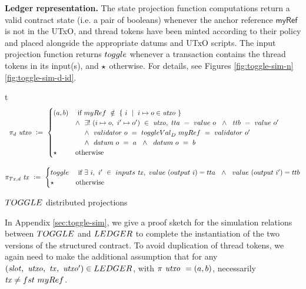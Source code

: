 \textbf{Ledger representation.}
\label{sec:led-rep}
The state projection function computations return a valid contract state (i.e. a pair of
booleans) whenever the anchor reference $\mathsf{myRef}$ is not in the UTxO,
and thread tokens have been minted according to their policy and placed alongside
the appropriate datums and UTxO scripts. The input projection function returns
$\toggle$ whenever a transaction contains the thread tokens in its input(s),
and $\star$ otherwise. For details,
see Figures \ref{fig:toggle-sim-n} \ref{fig:toggle-sim-d-id}.

\begin{ruledfigure}{t}
  \begin{align*}
    \pi_d~\var{utxo}&~ \leteq~\begin{cases}
      (a, b) & \text{ if } \mathsf{myRef}~\notin~\{ ~i~\mid~i\mapsto o \in  \var{utxo}~\} \\
      & \wedge~~ \exists ! ~(i\mapsto o,~i'\mapsto o')~\in~\var{utxo},~\fun{tta}~=~\val~o~~\wedge~~\fun{ttb}~=~\val~o'\\
      & ~~~~ \wedge~~\validator~o~=~\toggleVal_D~\mathsf{myRef}~=~\validator~o'~~\\
      & ~~~~\wedge~~\datum~o~=~a~~\wedge~~\datum~o~=~b \\
      \emptytype~& \text{otherwise}
    \end{cases}
    \nextdef
    \pi_{\Tx,d}~\var{tx}~ &\leteq~\begin{cases}
      \toggle & \text{ if } \exists~i,~i'~ \in~\inputs~\var{tx},~\val~(\fun{output}~i) = \fun{tta} ~~\wedge ~~\val~(\fun{output}~i') = \fun{ttb}\\
      \emptytype & \text{otherwise}
    \end{cases}
  \end{align*}
\caption{$\TOGGLE$ distributed projections}
\label{fig:toggle-sim-d-id}
\end{ruledfigure}

In Appendix \ref{sec:toggle-sim}, we give a proof sketch for the simulation
relations between $\TOGGLE$ and $\LEDGER$ to complete the instantiation of
the two versions of the structured contract. To avoid duplication of
thread tokens, we again need to make the
additional assumption that
for any $(\var{slot},~\var{utxo},~\var{tx},~\var{utxo'}) \in \LEDGER$, with
$\pi~\mathit{utxo}~= (a, b)$, necessarily $\var{tx} \neq \fun{fst}~\mathsf{myRef}$.


%
%

